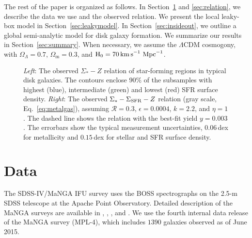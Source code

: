 \documentclass[12pt, appendixfloats, numberedappendix]{emulateapj}
\begin{document}
The rest of the paper is organized as follows. In Section~\ref{sec:data} and \ref{sec:relation}, we describe the data we use and the observed relation. 
We present the local leaky-box model in Section~\ref{sec:leakymodel}. In Section~\ref{sec:insideout}, we outline a global semi-analytic model for disk galaxy formation. 
We summarize our results in Section~\ref{sec:summary}.
When necessary, we assume the $\Lambda$CDM cosmogony, with $\Omega_\Lambda=0.7$, $\Omega_{\mathrm m}=0.3$, and ${\mathrm H}_0=70\,{\rm km\,s}^{-1}\,{\rm\,Mpc}^{-1}$. 

\begin{figure*}
\caption{\textit{Left}: The observed $\Sigma_{*}-Z$ relation of star-forming regions in typical disk galaxies. 
The contours enclose $90\%$ of the subsamples with highest (blue), intermediate (green) and lowest (red) SFR surface density. 
\textit{Right}: The observed $\Sigma_{*}-\Sigma_{\rm SFR}-Z$ relation (gray scale, Eq.~\ref{eq:metalgas}),
assuming $\mathcal{R}=0.3$, $\epsilon=0.0004$, $k=2.2$, and $\eta=1$. The dashed line shows the relation with the 
best-fit yield $y=0.003$. The errorbars show the typical measurement uncertainties,
$0.06\,$dex for metallicity and $0.15\,$dex for stellar and SFR surface density.
}
\vspace{0.2cm}
\label{fig:relation}
\end{figure*}


\section{Data}\label{sec:data}
The SDSS-IV/MaNGA IFU survey uses the BOSS spectrographs \citep[]{smee13a} 
on the 2.5-m SDSS telescope \citep[][]{gunn06a} at the Apache Point Observatory.
Detailed description of the MaNGA surveys are available in \citet[][overview]{bundy15a}, \citet[][instrumentation]{drory15a},
\citet[][observation, data reduction]{law15a, law16a}, and \citet[][calibration, survey design]{yan16a, yan16b}.
We use the fourth internal data release of the MaNGA survey (MPL-4), which includes $1390$ galaxies observed as of June 2015. 
\end{document}
